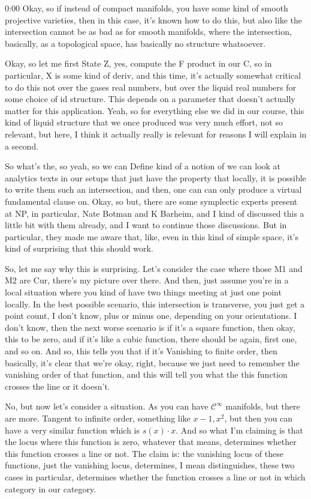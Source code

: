 \begin{unfinished}{0:00}
Okay, so if instead of compact manifolds, you have some kind of smooth projective varieties, then in this case, it's known how to do this, but also like the intersection cannot be as bad as for smooth manifolds, where the intersection, basically, as a topological space, has basically no structure whatsoever.

Okay, so let me first State Z, yes, compute the F product in our C, so in particular, X is some kind of deriv, and this time, it's actually somewhat critical to do this not over the gases real numbers, but over the liquid real numbers for some choice of id structure. This depends on a parameter that doesn't actually matter for this application. Yeah, so for everything else we did in our course, this kind of liquid structure that we once produced was very much effort, not so relevant, but here, I think it actually really is relevant for reasons I will explain in a second.

So what's the, so yeah, so we can Define kind of a notion of we can look at analytics texts in our setups that just have the property that locally, it is possible to write them such an intersection, and then, one can can only produce a virtual fundamental clause on. Okay, so but, there are some symplectic experts present at NP, in particular, Nate Botman and K Barheim, and I kind of discussed this a little bit with them already, and I want to continue those discussions. But in particular, they made me aware that, like, even in this kind of simple space, it's kind of surprising that this should work.

So, let me say why this is surprising. Let's consider the case where those M1 and M2 are Cur, there's my picture over there. And then, just assume you're in a local situation where you kind of have two things meeting at just one point locally. In the best possible scenario, this intersection is transverse, you just get a point count, I don't know, plus or minus one, depending on your orientations. I don't know, then the next worse scenario is if it's a square function, then okay, this to be zero, and if it's like a cubic function, there should be again, first one, and so on. And so, this tells you that if it's Vanishing to finite order, then basically, it's clear that we're okay, right, because we just need to remember the vanishing order of that function, and this will tell you what the this function crosses the line or it doesn't.

No, but now let's consider a situation. As you can have $\mathcal{C}^\infty$ manifolds, but there are more. Tangent to infinite order, something like $x - 1, x^2$, but then you can have a very similar function which is $s(x) \cdot x$. And so what I'm claiming is that the locus where this function is zero, whatever that means, determines whether this function crosses a line or not. The claim is: the vanishing locus of these functions, just the vanishing locus, determines, I mean distinguishes, these two cases in particular, determines whether the function crosses a line or not in which category in our category.


\end{unfinished}
